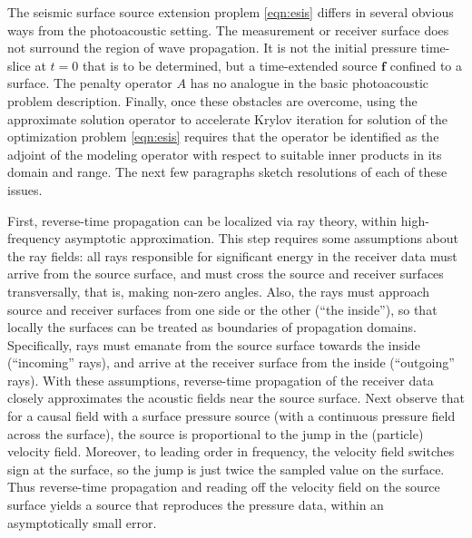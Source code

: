 \documentclass[georeport,12pt]{geophysics}
\newcommand{\bff}{\mathbf{f}}
\begin{document}
The seismic surface source extension proplem \ref{eqn:esis} differs in
several obvious ways from the photoacoustic setting. The measurement
or receiver surface does not surround the region of wave
propagation. It is not the initial pressure time-slice at $t=0$ that
is to be determined, but a time-extended source $\bff$ confined to a
surface. The penalty operator $A$ has no analogue in the basic
photoacoustic problem description. Finally, once these obstacles are
overcome, using the approximate solution operator to accelerate Krylov
iteration for solution of the optimization problem \ref{eqn:esis}
requires that the operator be identified as the adjoint of the
modeling operator with respect to suitable inner products in its
domain and range. The next few paragraphs sketch resolutions of each
of these issues.

First, reverse-time propagation can be localized via ray theory,
within high-frequency asymptotic approximation. This step requires
some assumptions about the ray fields: all rays responsible for
significant energy in the receiver data must arrive from the source
surface, and must cross the source and receiver surfaces
transversally, that is, making non-zero angles. Also, the rays must
approach source and receiver surfaces from one side or the other
(``the inside''), so that locally the surfaces can be treated as
boundaries of propagation domains. Specifically, rays must emanate
from the source surface towards the inside (``incoming'' rays), and
arrive at the receiver surface from the inside (``outgoing'' rays).
With these assumptions, reverse-time propagation of the receiver data
closely approximates the acoustic fields near the source surface. Next
observe that for a causal field with a surface pressure source (with a
continuous pressure field across the surface), the source is
proportional to the jump in the (particle) velocity field. Moreover,
to leading order in frequency, the velocity field switches sign at the
surface, so the jump is just twice the sampled value on the
surface. Thus reverse-time propagation and reading off the velocity
field on the source surface yields a source that reproduces the
pressure data, within an asymptotically small error.
\end{document}
